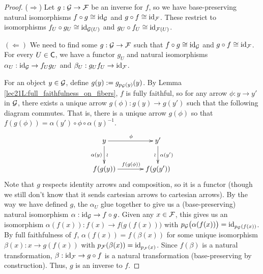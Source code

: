  \begin{proof}
   ($\Rightarrow$) Let $g:\mathcal{G}\to \mathcal{F}$ be an inverse for $f$, so we have base-preserving
   natural isomorphisms $f\circ g\cong \operatorname{id}_{\mathcal{G}}$ and $g\circ f\cong \operatorname{id}_{\mathcal{F}}$. These restrict
   to isomorphisms $f_U\circ g_U\cong \operatorname{id}_{\mathcal{G}(U)}$ and $g_U\circ f_U\cong \operatorname{id}_{\mathcal{F}(U)}$.

   $(\Leftarrow)$ We need to find some $g:\mathcal{G}\to \mathcal{F}$ such that $f\circ g\cong \operatorname{id}_{\mathcal{G}}$ and
   $g\circ f\cong \operatorname{id}_{\mathcal{F}}$. For every $U\in \text{\sf C}$, we have a functor $g_U$ and natural
   isomorphisms $\alpha_U:\operatorname{id}_{\mathcal{G}}\to f_Ug_U$ and $\beta_U:g_Uf_U\to \operatorname{id}_{\mathcal{F}}$.

   For an object $y\in \mathcal{G}$, define $g(y):=g_{p_{\mathcal{G}}(y)}(y)$. By Lemma
   \ref{lec21L:full_faithfulness_on_fibers}, $f$ is fully faithful, so for any arrow
   $\phi:y\to y'$ in $\mathcal{G}$, there exists a unique arrow $g(\phi):g(y)\to g(y')$ such that
   the following diagram commutes. That is, there is a unique arrow $g(\phi)$ so that
   $f(g(\phi))=\alpha(y')\circ \phi \circ \alpha(y)^{-1}$.
   \[\xymatrix@C+1pc{
    y\ar[r]^\phi \ar[d]_{\alpha(y)}^\wr & y'\ar[d]^{\alpha(y')}_\wr \\
    f(g(y))\ar[r]^{f(g(\phi))} & f(g(y'))
   }\]
    Note that $g$ respects identity arrows and composition, so it is a functor (though we
   still don't know that it sends cartesian arrows to cartesian arrows). By the way we
   have defined $g$, the $\alpha_U$ glue together to give us a (base-preserving) natural
   isomorphism $\alpha:\operatorname{id}_{\mathcal{G}}\to f\circ g$. Given any $x\in \mathcal{F}$, this gives us an
   isomorphism $\alpha(f(x)):f(x)\to f\bigl(g(f(x))\bigr)$ with
   $p_{\mathcal{G}}\bigl(\alpha(f(x))\bigr)=\operatorname{id}_{p_{\mathcal{G}}(f(x))}$. By full faithfulness of $f$,
   $\alpha(f(x))=f(\beta(x))$ for some unique isomorphism $\beta(x):x\to g(f(x))$ with
   $p_{\mathcal{F}}(\beta(x))=\operatorname{id}_{p_{\mathcal{F}}(x)}$. Since $f(\beta)$ is a natural transformation,
   $\beta:\operatorname{id}_{\mathcal{F}}\to g\circ f$ is a natural transformation (base-preserving by
   construction). Thus, $g$ is an inverse to $f$.


\end{proof}
